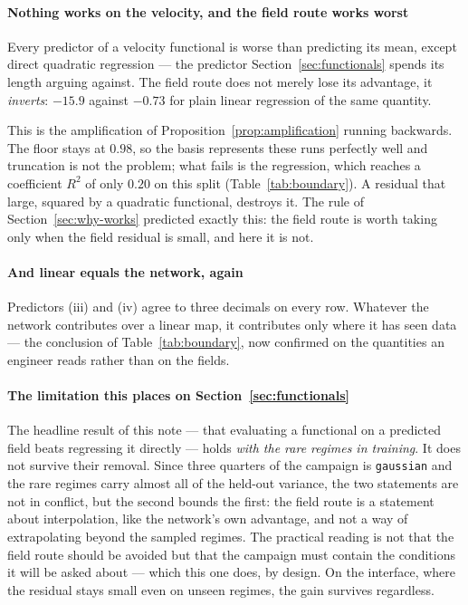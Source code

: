 \documentclass[11pt,a4paper]{article}
\theoremstyle{plain}
\theoremstyle{definition}
\theoremstyle{remark}
\begin{document}
\paragraph{Nothing works on the velocity, and the field route works worst}
Every predictor of a velocity functional is worse than predicting its mean,
except direct quadratic regression --- the predictor
Section~\ref{sec:functionals} spends its length arguing against. The field route
does not merely lose its advantage, it \emph{inverts}: $-15.9$ against $-0.73$
for plain linear regression of the same quantity.

This is the amplification of Proposition~\ref{prop:amplification} running
backwards. The floor stays at $0.98$, so the basis represents these runs
perfectly well and truncation is not the problem; what fails is the regression,
which reaches a coefficient $R^2$ of only $0.20$ on this split
(Table~\ref{tab:boundary}). A residual that large, squared by a quadratic
functional, destroys it. The rule of Section~\ref{sec:why-works} predicted
exactly this: the field route is worth taking only when the field residual is
small, and here it is not.

\paragraph{And linear equals the network, again}
Predictors (iii) and (iv) agree to three decimals on every row. Whatever the
network contributes over a linear map, it contributes only where it has seen
data --- the conclusion of Table~\ref{tab:boundary}, now confirmed on the
quantities an engineer reads rather than on the fields.

\paragraph{The limitation this places on Section~\ref{sec:functionals}}
The headline result of this note --- that evaluating a functional on a predicted
field beats regressing it directly --- holds \emph{with the rare regimes in
training}. It does not survive their removal. Since three quarters of the
campaign is \texttt{gaussian} and the rare regimes carry almost all of the
held-out variance, the two statements are not in conflict, but the second bounds
the first: the field route is a statement about interpolation, like the
network's own advantage, and not a way of extrapolating beyond the sampled
regimes. The practical reading is not that the field route should be avoided but that
the campaign must contain the conditions it will be asked about --- which this
one does, by design. On the interface, where the residual stays small even on
unseen regimes, the gain survives regardless.
\end{document}
